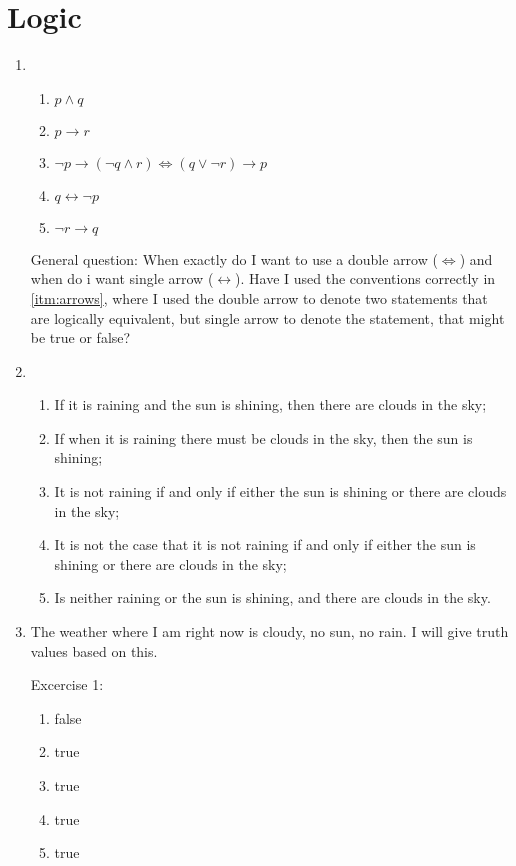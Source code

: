 \documentclass{article}
\begin{document}
\section{Logic}

\begin{enumerate}
    \item
        \begin{enumerate}
            \item $ p \land q $
            \item $ p \to r $
            \item \label{itm:arrows} $ \lnot p \to (\lnot q \land r) \Leftrightarrow (q \lor \lnot r) \to p $
            \item $ q \leftrightarrow \lnot p $
            \item $ \lnot r \to q $
        \end{enumerate}
        General question: When exactly do I want to use a double arrow
        ($\Leftrightarrow$) and when do i want single arrow
        ($\leftrightarrow$). Have I used the conventions correctly in
        \ref{itm:arrows}, where I used the double arrow to denote two
        statements that are logically equivalent, but single arrow to denote
        the statement, that might be true or false?
    \item
        \begin{enumerate}
            \item If it is raining and the sun is shining, then there are clouds in the sky;
            \item If when it is raining there must be clouds in the sky, then the sun is shining;
            \item It is not raining if and only if either the sun is shining or there are clouds in the sky;
            \item It is not the case that it is not raining if and only if either the sun is shining or there are clouds in the sky;
            \item Is neither raining or the sun is shining, and there are clouds in the sky.
        \end{enumerate}
    \item The weather where I am right now is cloudy, no sun, no rain. I will give truth values based on this.

        Excercise 1:
        \begin{enumerate}
            \item false
            \item true
            \item true
            \item true
            \item true
        \end{enumerate}


\end{enumerate}
\end{document}
